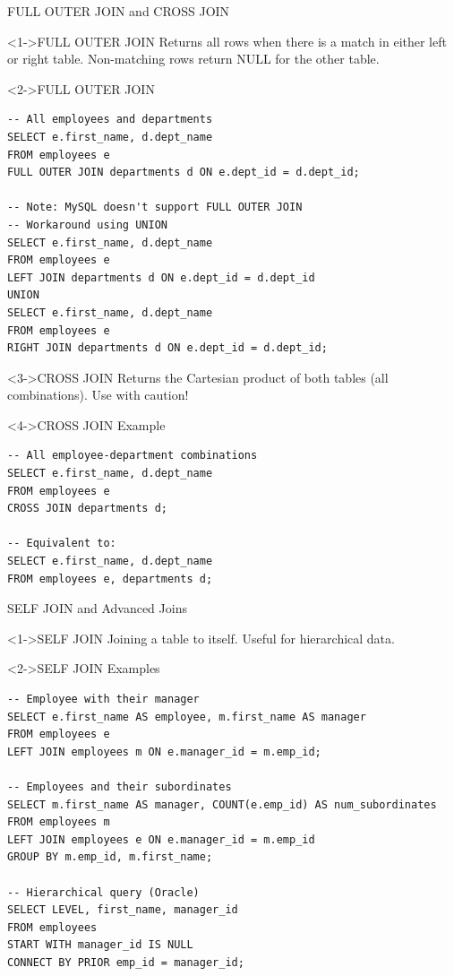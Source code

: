 \documentclass[aspectratio=169,11pt]{beamer}
\begin{document}
\begin{frame}[fragile]{FULL OUTER JOIN and CROSS JOIN}
\begin{block}<1->{FULL OUTER JOIN}
Returns all rows when there is a match in either left or right table. Non-matching rows return NULL for the other table.
\end{block}

\pause
\begin{exampleblock}<2->{FULL OUTER JOIN}
\begin{lstlisting}
-- All employees and departments
SELECT e.first_name, d.dept_name
FROM employees e
FULL OUTER JOIN departments d ON e.dept_id = d.dept_id;

-- Note: MySQL doesn't support FULL OUTER JOIN
-- Workaround using UNION
SELECT e.first_name, d.dept_name
FROM employees e
LEFT JOIN departments d ON e.dept_id = d.dept_id
UNION
SELECT e.first_name, d.dept_name
FROM employees e
RIGHT JOIN departments d ON e.dept_id = d.dept_id;
\end{lstlisting}
\end{exampleblock}

\pause
\begin{block}<3->{CROSS JOIN}
Returns the Cartesian product of both tables (all combinations). Use with caution!
\end{block}

\pause
\begin{exampleblock}<4->{CROSS JOIN Example}
\begin{lstlisting}
-- All employee-department combinations
SELECT e.first_name, d.dept_name
FROM employees e
CROSS JOIN departments d;

-- Equivalent to:
SELECT e.first_name, d.dept_name
FROM employees e, departments d;
\end{lstlisting}
\end{exampleblock}
\end{frame}

\begin{frame}[fragile]{SELF JOIN and Advanced Joins}
\begin{block}<1->{SELF JOIN}
Joining a table to itself. Useful for hierarchical data.
\end{block}

\pause
\begin{exampleblock}<2->{SELF JOIN Examples}
\begin{lstlisting}
-- Employee with their manager
SELECT e.first_name AS employee, m.first_name AS manager
FROM employees e
LEFT JOIN employees m ON e.manager_id = m.emp_id;

-- Employees and their subordinates
SELECT m.first_name AS manager, COUNT(e.emp_id) AS num_subordinates
FROM employees m
LEFT JOIN employees e ON e.manager_id = m.emp_id
GROUP BY m.emp_id, m.first_name;

-- Hierarchical query (Oracle)
SELECT LEVEL, first_name, manager_id
FROM employees
START WITH manager_id IS NULL
CONNECT BY PRIOR emp_id = manager_id;
\end{lstlisting}
\end{exampleblock}
\end{frame}
\end{document}
